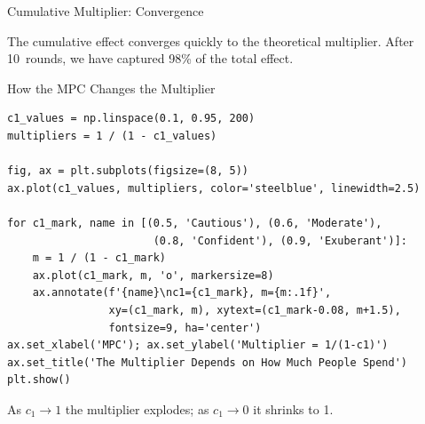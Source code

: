 \documentclass[aspectratio=169, 10pt]{beamer}
\begin{document}
\begin{frame}{Cumulative Multiplier: Convergence}
\begin{center}
\end{center}
\vspace{0.3em}
The cumulative effect converges quickly to the theoretical multiplier.
After 10~rounds, we have captured 98\% of the total effect.
\end{frame}

\begin{frame}[fragile]{How the MPC Changes the Multiplier}
\begin{lstlisting}
c1_values = np.linspace(0.1, 0.95, 200)
multipliers = 1 / (1 - c1_values)

fig, ax = plt.subplots(figsize=(8, 5))
ax.plot(c1_values, multipliers, color='steelblue', linewidth=2.5)

for c1_mark, name in [(0.5, 'Cautious'), (0.6, 'Moderate'),
                       (0.8, 'Confident'), (0.9, 'Exuberant')]:
    m = 1 / (1 - c1_mark)
    ax.plot(c1_mark, m, 'o', markersize=8)
    ax.annotate(f'{name}\nc1={c1_mark}, m={m:.1f}',
                xy=(c1_mark, m), xytext=(c1_mark-0.08, m+1.5),
                fontsize=9, ha='center')
ax.set_xlabel('MPC'); ax.set_ylabel('Multiplier = 1/(1-c1)')
ax.set_title('The Multiplier Depends on How Much People Spend')
plt.show()
\end{lstlisting}
\vspace{0.3em}
As $c_1 \to 1$ the multiplier explodes; as $c_1 \to 0$ it shrinks to 1.
\end{frame}
\end{document}
